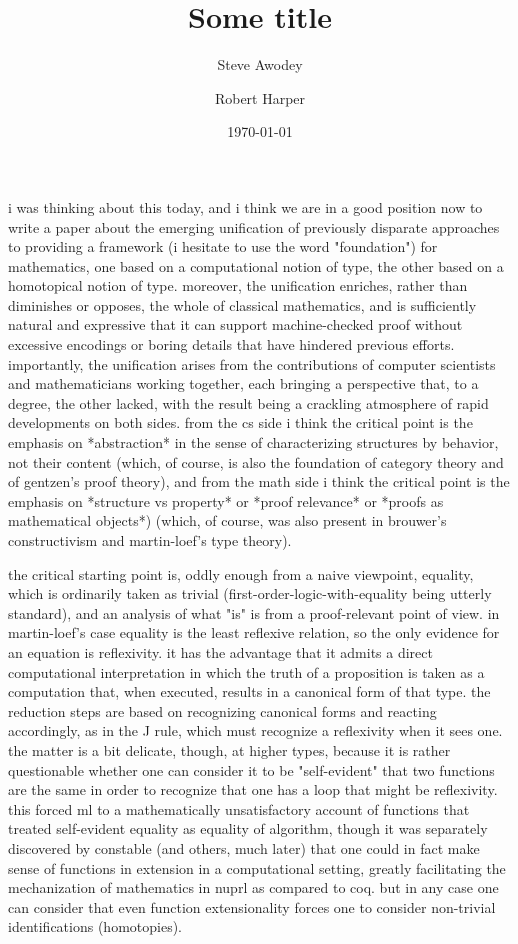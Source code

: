 \documentclass[11pt]{article}
\theoremstyle{remark}
\theoremstyle{definition}
\begin{document}

\title{Some title}
\author{Steve Awodey \and Robert Harper}
\date{\today}

\maketitle


i was thinking about this today, and i think we are in a good position now to write a paper about the emerging unification of previously disparate approaches to providing a framework (i hesitate to use the word "foundation") for mathematics, one based on a computational notion of type, the other based on a homotopical notion of type.  moreover, the unification enriches, rather than diminishes or opposes, the whole of classical mathematics, and is sufficiently natural and expressive that it can support machine-checked proof without excessive encodings or boring details that have hindered previous efforts.  importantly, the unification arises from the contributions of computer scientists and mathematicians working together, each bringing a perspective that, to a degree, the other lacked, with the result being a crackling atmosphere of rapid developments on both sides.  from the cs side i think the critical point is the emphasis on *abstraction* in the sense of characterizing structures by behavior, not their content (which, of course, is also the foundation of category theory and of gentzen's proof theory), and from the math side i think the critical point is the emphasis on *structure vs property* or *proof relevance* or *proofs as mathematical objects*) (which, of course, was also present in brouwer's constructivism and martin-loef's type theory).

the critical starting point is, oddly enough from a naive viewpoint, equality, which is ordinarily taken as trivial (first-order-logic-with-equality being utterly standard), and an analysis of what "is" is from a proof-relevant point of view.  in martin-loef's case equality is the least reflexive relation, so the only evidence for an equation is reflexivity.  it has the advantage that it admits a direct computational interpretation in which the truth of a proposition is taken as a computation that, when executed, results in a canonical form of that type.  the reduction steps are based on recognizing canonical forms and reacting accordingly, as in the J rule, which must recognize a reflexivity when it sees one.  the matter is a bit delicate, though, at higher types, because it is rather questionable whether one can consider it to be "self-evident" that two functions are the same in order to recognize that one has a loop that might be reflexivity.  this forced ml to a mathematically unsatisfactory account of functions that treated self-evident equality as equality of algorithm, though it was separately discovered by constable (and others, much later) that one could in fact make sense of functions in extension in a computational setting, greatly facilitating the mechanization of mathematics in nuprl as compared to coq.  but in any case one can consider that even function extensionality forces one to consider non-trivial identifications (homotopies).
\end{document}
